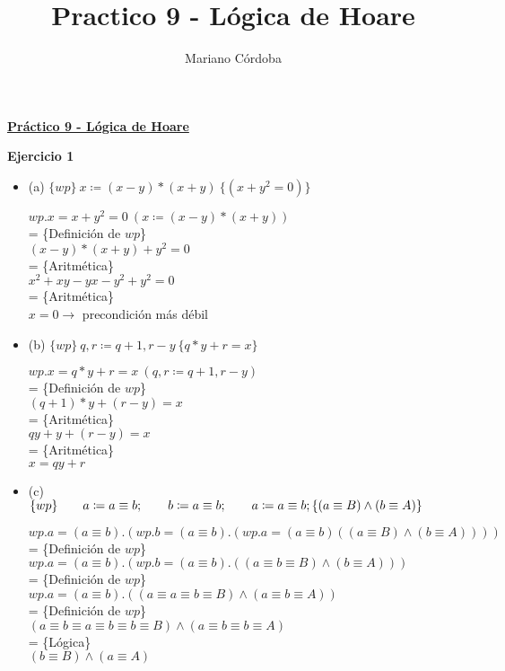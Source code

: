\documentclass[12pt]{article}
\title{Practico 9 - Lógica de Hoare}
\author{Mariano Córdoba}
\begin{document}
\begin{center}
\large \underline{\textbf{Práctico 9 - Lógica de Hoare}}
\end{center}

\textbf{Ejercicio 1}

\begin{itemize}
    \item (a) $\{wp\} ~ x \coloneqq (x - y) * (x + y) ~ \{(x + y^2 = 0)\}$

    \bigbreak

    $wp.x = x + y^2 = 0 ~(x \coloneqq (x - y) * (x + y))$\\
    = \{Definición de $wp$\}\\
    $(x - y) * (x + y) + y^2 = 0$\\
    = \{Aritmética\}\\
    $x^2 + xy - yx - y^2 + y^2 = 0$\\
    = \{Aritmética\}\\
    $x = 0 \rightarrow $ precondición más débil 

    \item (b) $\{wp\} ~ q, r \coloneqq q + 1, r - y ~ \{q * y + r = x\}$

    \bigbreak

    $wp.x = q * y + r = x ~(q, r \coloneqq q + 1, r - y)$\\
    = \{Definición de $wp$\}\\
    $(q + 1) * y + (r - y) = x$\\
    = \{Aritmética\}\\
    $qy + y + (r - y) = x$\\
    = \{Aritmética\}\\
    $x = qy + r$

    \item (c) \\
        $\{wp\}\\ 
        \hspace*{20pt}a \coloneqq a \equiv b;\\ 
        \hspace*{20pt}b \coloneqq a \equiv b;\\ 
        \hspace*{20pt}a \coloneqq a \equiv b;\\ 
        \{(a \equiv B) \land (b \equiv A)\}$

    \bigbreak

    $wp.a = (a \equiv b).(wp.b = (a \equiv b).(wp.a = (a \equiv b)((a \equiv B) \land (b \equiv A))))$\\
    = \{Definición de $wp$\}\\
    $wp.a = (a \equiv b).(wp.b = (a \equiv b).((a \equiv b \equiv B) \land (b \equiv A)))$\\
    = \{Definición de $wp$\}\\
    $wp.a = (a \equiv b).((a \equiv a \equiv b \equiv B) \land (a \equiv b \equiv A))$\\
    = \{Definición de $wp$\}\\
    $(a \equiv b \equiv a \equiv b \equiv b \equiv B) \land (a \equiv b \equiv b \equiv A)$\\
    = \{Lógica\}\\
    $(b \equiv B) \land (a \equiv A)$


\end{itemize}
\end{document}
